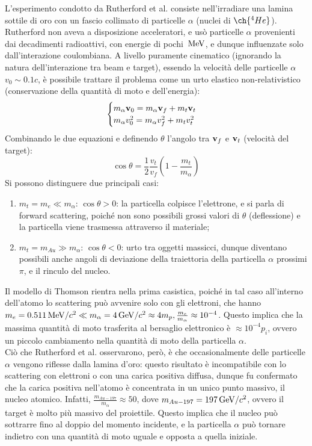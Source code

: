 L'esperimento condotto da Rutherford et al. consiste nell'irradiare una lamina sottile di oro con un fascio collimato di particelle $ \alpha $ (nuclei di $ \ch{^{4} He} $). Rutherford non aveva a disposizione acceleratori, e usò particelle $\alpha$ provenienti dai decadimenti radioattivi, con energie di pochi $ \,\mathrm{MeV} $, e dunque influenzate solo dall'interazione coulombiana. A livello puramente cinematico (ignorando la natura dell'interazione tra beam e target), essendo la velocità delle particelle $ \alpha $ $ v_0 \sim 0.1c $, è possibile trattare il problema come un urto elastico non-relativistico (conservazione della quantità di moto e dell'energia):
\begin{equation}
	\begin{cases}
	  m_{\alpha} \mathbf{v}_0 = m_{\alpha} \mathbf{v}_f + m_t \mathbf{v}_t \\
	  m_{\alpha} v_0^2 = m_{\alpha} v_f^2 + m_t v_t^2 \\
	\end{cases}
	\label{eq:2}
\end{equation}
Combinando le due equazioni e definendo $ \theta $ l'angolo tra $ \mathbf{v}_f $ e $ \mathbf{v}_t $ (velocità del target):
\begin{equation}
	\cos \theta = \frac{1}{2} \frac{v_t}{v_f} \left(1 - \frac{m_t}{m_{\alpha}}\right)
	\label{eq:3}
\end{equation}
Si possono distinguere due principali casi:
\begin{enumerate}
	\item $ m_t = m_e \ll m_{\alpha} $: $ \cos \theta > 0 $: la particella colpisce l'elettrone, e si parla di forward scattering, poiché non sono possibili grossi valori di $ \theta $ (deflessione) e la particella viene trasmessa attraverso il materiale;
	\item $ m_t = m_{Au} \gg m_{\alpha} $: $ \cos \theta < 0 $: urto tra oggetti massicci, dunque diventano possibili anche angoli di deviazione della traiettoria della particella $\alpha$ prossimi $ \pi $, e il rinculo del nucleo.
\end{enumerate}
Il modello di Thomson rientra nella prima casistica, poiché in tal caso all'interno dell'atomo lo scattering può avvenire solo con gli elettroni, che hanno $ m_e = 0.511 \,\mathrm{MeV}/c^2 \ll m_{\alpha} = 4 \,\mathrm{GeV}/c^2 \approx 4m_p , \frac{m_e}{m_{\alpha}} \approx 10^{-4} $. Questo implica che la massima quantità di moto trasferita al bersaglio elettronico è $\approx 10^{-4} p_i$, ovvero un piccolo cambiamento nella quantità di moto della particella $\alpha$.\\
Ciò che Rutherford et al. osservarono, però, è che occasionalmente delle particelle $ \alpha $ vengono riflesse dalla lamina d'oro: questo risultato è incompatibile con lo scattering con elettroni o con una carica positiva diffusa, dunque fu confermato che la carica positiva nell'atomo è concentrata in un unico punto massivo, il nucleo atomico. Infatti, $\frac{m_{Au-197}}{m_{\alpha}}\approx 50$, dove $m_{Au-197}=197 \,\mathrm{GeV}/c^2$, ovvero il target è molto più massivo del proiettile. Questo implica che il nucleo può sottrarre fino al doppio del momento incidente, e la particella $\alpha$ può tornare indietro con una quantità di moto uguale e opposta a quella iniziale.

